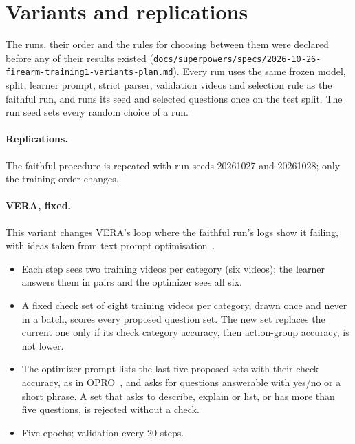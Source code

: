 \section{Variants and replications}\label{sec:variants}
The runs, their order and the rules for choosing between them were declared before any of their results existed (\texttt{docs/superpowers/specs/2026-10-26-firearm-training1-variants-plan.md}). Every run uses the same frozen model, split, learner prompt, strict parser, validation videos and selection rule as the faithful run, and runs its seed and selected questions once on the test split. The run seed sets every random choice of a run.

\paragraph{Replications.} The faithful procedure is repeated with run seeds 20261027 and 20261028; only the training order changes.

\paragraph{VERA, fixed.} This variant changes VERA's loop where the faithful run's logs show it failing, with ideas taken from text prompt optimisation~\cite{yang2024opro,zhou2023ape,pryzant2023protegi}.
\begin{itemize}
\item Each step sees two training videos per category (six videos); the learner answers them in pairs and the optimizer sees all six.
\item A fixed check set of eight training videos per category, drawn once and never in a batch, scores every proposed question set. The new set replaces the current one only if its check category accuracy, then action-group accuracy, is not lower.
\item The optimizer prompt lists the last five proposed sets with their check accuracy, as in OPRO~\cite{yang2024opro}, and asks for questions answerable with yes/no or a short phrase. A set that asks to describe, explain or list, or has more than five questions, is rejected without a check.
\item Five epochs; validation every 20 steps.
\end{itemize}

